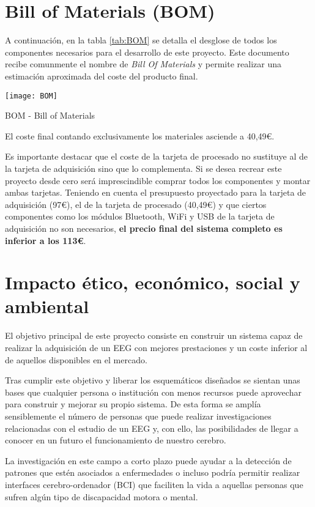 \chapter{Bill of Materials (BOM)\label{sec:BOM}}

A continuación, en la tabla \ref{tab:BOM} se detalla el desglose de todos los componentes necesarios para el desarrollo de este proyecto. Este documento recibe comunmente el nombre de \textit{Bill Of Materials} y permite realizar una estimación aproximada del coste del producto final.

\begin{table} [H]
\centering
\texttt{[image: BOM]}
\caption{BOM - Bill of Materials}
\label{tab:BOM}
\end{table}

El coste final contando exclusivamente los materiales asciende a 40,49€. 

\clearpage

Es importante destacar que el coste de la tarjeta de procesado no sustituye al de la tarjeta de adquisición sino que lo complementa. Si se desea recrear este proyecto desde cero será imprescindible comprar todos los componentes y montar ambas tarjetas.
Teniendo en cuenta el presupuesto proyectado para la tarjeta de adquisición (97€), el de la tarjeta de procesado (40,49€) y que ciertos componentes como los módulos Bluetooth, WiFi y USB de la tarjeta de adquisición no son necesarios, \textbf{el precio final del sistema completo es inferior a los 113€}.

\chapter{Impacto ético, económico, social y ambiental\label{sec:Impacto}}

El objetivo principal de este proyecto consiste en construir un sistema capaz de realizar la adquisición de un \acrshort{EEG} con mejores prestaciones y un coste inferior al de aquellos disponibles en el mercado.

Tras cumplir este objetivo y liberar los esquemáticos diseñados se sientan unas bases que cualquier persona o institución con menos recursos puede aprovechar para construir y mejorar su propio sistema. De esta forma se amplía sensiblemente el número de personas que puede realizar investigaciones relacionadas con el estudio de un EEG y, con ello, las posibilidades de llegar a conocer en un futuro el funcionamiento de nuestro cerebro.

La investigación en este campo a corto plazo puede ayudar a la detección de patrones que estén asociados a enfermedades o incluso podría permitir realizar interfaces cerebro-ordenador (BCI) que faciliten la vida a aquellas personas que sufren algún tipo de discapacidad motora o mental.

